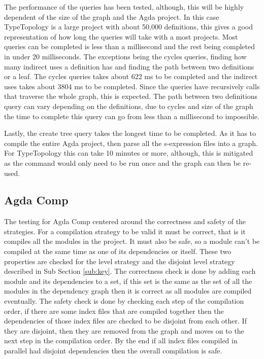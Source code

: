 The performance of the queries has been tested, although, this will be highly
dependent of the size of the graph and the Agda project. In this case
TypeTopology is a large project with about 50,000 definitions, this gives a
good representation of how long the queries will take with a most projects.
Most queries can be completed is less than a millisecond and the rest being
completed in under 20 milliseconds. The exceptions being the cycles queries,
finding how many indirect uses a definition has and finding the path between
two definitions or a leaf. The cycles queries takes about 622 ms to be
completed and the indirect uses takes about 3804 ms to be completed. Since the
queries have recursively calls that traverse the whole graph, this is expected.
The path between two definitions query can vary depending on the definitions,
due to cycles and size of the graph the time to complete this query can go from
less than a millisecond to impossible.

Lastly, the create tree query takes the longest time to be completed. As it has
to compile the entire Agda project, then parse all the s-expression files into
a graph. For TypeTopology this can take 10 minutes or more, although, this is
mitigated as the command would only need to be run once and the graph can then
be re-used.

\subsection{Agda Comp}

The testing for Agda Comp centered around the correctness and safety of the
strategies. For a compilation strategy to be valid it must be correct, that is
it compiles all the modules in the project. It must also be safe, so a module
can't be compiled at the same time as one of its dependencies or itself. These
two properties are checked for the level strategy and the disjoint level
strategy described in Sub Section \ref{sub:key}. The correctness check is done
by adding each module and its dependencies to a set, if this set is the same as
the set of all the modules in the dependency graph then it is correct as all
modules are compiled eventually. The safety check is done by checking each step
of the compilation order, if there are some index files that are compiled
together then the dependencies of those index files are checked to be disjoint
from each other. If they are disjoint, then they are removed from the graph and
moves on to the next step in the compilation order. By the end if all index
files compiled in parallel had disjoint dependencies then the overall
compilation is safe.

